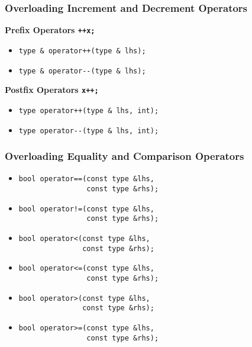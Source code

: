 \documentclass{beamer}
\begin{document}
\begin{frame}[fragile]
    \frametitle{Overloading Increment and Decrement Operators}
    {\bf Prefix Operators {\tt ++x;}}
    \begin{itemize}
        \item \begin{verbatim}type & operator++(type & lhs);\end{verbatim}
        \item \begin{verbatim}type & operator--(type & lhs);\end{verbatim}
    \end{itemize}
    \vspace{0.25in}
    \par{\bf Postfix Operators {\tt x++;}}
    \begin{itemize}
        \item \begin{verbatim}type operator++(type & lhs, int);\end{verbatim}
        \item \begin{verbatim}type operator--(type & lhs, int);\end{verbatim}
    \end{itemize}
\end{frame}

\begin{frame}[fragile]
    \frametitle{Overloading Equality and Comparison Operators}
    \begin{itemize}
        \item \begin{verbatim}
bool operator==(const type &lhs, 
                const type &rhs);\end{verbatim}
        \item \begin{verbatim}
bool operator!=(const type &lhs, 
                const type &rhs);\end{verbatim}
        \item \begin{verbatim}
bool operator<(const type &lhs, 
               const type &rhs);\end{verbatim}
        \item \begin{verbatim}
bool operator<=(const type &lhs, 
                const type &rhs);\end{verbatim}
        \item \begin{verbatim}
bool operator>(const type &lhs, 
               const type &rhs);\end{verbatim}
        \item \begin{verbatim}
bool operator>=(const type &lhs, 
                const type &rhs);\end{verbatim}
    \end{itemize}
\end{frame}
\end{document}
